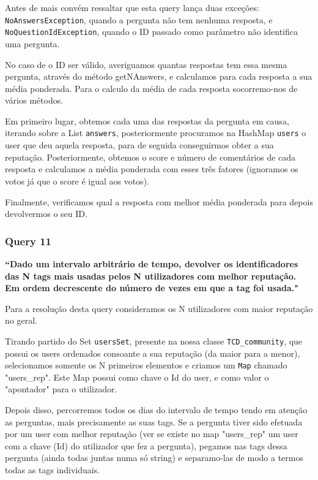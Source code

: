 \documentclass[a4paper]{article}
\begin{document}
Antes de mais convém ressaltar que esta query lança duas exceções:
\texttt{NoAnswersException}, quando a pergunta não tem nenhuma resposta, e
\texttt{NoQuestionIdException}, quando o ID passado como parâmetro não identifica
uma pergunta.\par
No caso de o ID ser válido, averiguamos quantas respostas tem essa mesma pergunta,
através do método getNAnswers, e calculamos para cada resposta a sua média ponderada.
Para o calculo da média de cada resposta socorremo-nos de vários métodos.\par
Em primeiro lugar, obtemos cada uma das respostas da pergunta em causa, iterando
sobre a List \texttt{answers}, posteriormente procuramos na HashMap \texttt{users}
o user que deu aquela resposta, para de seguida conseguirmos obter a sua reputação.
Posteriormente, obtemos o score e número de comentários de cada resposta e calculamos
a média ponderada com esses três fatores (ignoramos os votos já que o score é
igual aos votos).\par
Finalmente, verificamos qual a resposta com melhor média ponderada para depois
devolvermos o seu ID.





\subsubsection*{Query 11}
\label{sec:query11}

\textbf{“Dado um intervalo arbitrário de tempo, devolver os identificadores das N tags
mais usadas pelos N utilizadores com melhor reputação. Em ordem decrescente do número
de vezes em que a tag foi usada."}

\vspace{0.1cm}

Para a resolução desta query consideramos os N utilizadores com maior reputação no geral.

Tirando partido do Set \texttt{usersSet}, presente na nossa classe
\texttt{TCD\_community},
que possui os users ordenados consoante a sua reputação (da maior
para a menor), selecionamos somente os N primeiros elementos e
criamos um \texttt{Map} chamado "users\_rep". Este Map possui como
chave o Id do user, e como valor o "apontador" para o utilizador.

Depois disso, percorremos todos os dias do intervalo
de tempo tendo em atenção as perguntas, mais precisamente as suas tags.
Se a pergunta tiver sido efetuada por um user com melhor reputação (ver se existe
no map "users\_rep" um user com a chave (Id) do utilizador que fez a pergunta),
pegamos nas tags dessa pergunta (ainda todas juntas numa só string) e separamo-las
de modo a termos todas as tags individuais.
\end{document}
